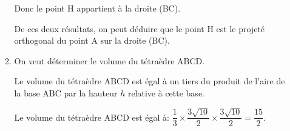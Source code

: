 \begin{enumerate}
\begin{enumerate}[label=\textbf{\alph*.}]
\begin{list}{\textbullet}{}
Donc le point H appartient à la droite (BC).
\end{list}		
		
De ces deux résultats, on peut déduire que le point H est le projeté orthogonal du point A sur la droite (BC).		
		
		\item On veut déterminer le volume du tétraèdre ABCD.


Le volume du tétraèdre ABCD est égal à un tiers du produit de l'aire de la base ABC par la hauteur $h$ relative à cette base.
 

Le volume du tétraèdre ABCD est égal à:
$\dfrac{1}{3}\times \dfrac{3\sqrt{10}}{2}\times \dfrac{3\sqrt{10}}{2}
= \dfrac{15}{2}$.
	\end{enumerate}
\end{enumerate}
